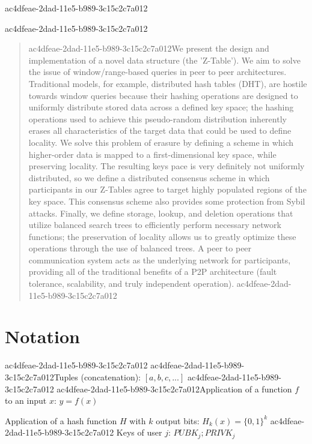 \documentclass[12pt]{article}
\begin{document}
ac4dfeae-2dad-11e5-b989-3c15c2c7a012
\maketitle

ac4dfeae-2dad-11e5-b989-3c15c2c7a012\begin{abstract}
ac4dfeae-2dad-11e5-b989-3c15c2c7a012We present the design and implementation of a novel data structure (the 'Z-Table'). We aim to solve the issue of window/range-based queries in peer to peer architectures. Traditional models, for example,  distributed hash tables (DHT), are hostile towards window queries because their hashing operations are designed to uniformly distribute stored data across a defined key space; the hashing operations used to achieve this pseudo-random distribution inherently erases all characteristics of the target data that could be used to define locality. We solve this problem of erasure by defining a scheme in which higher-order data is mapped to a first-dimensional key space, while preserving locality. The resulting keys pace is very definitely not uniformly distributed, so we define a distributed consensus scheme in which participants in our Z-Tables agree to target highly populated regions of the key space. This consensus scheme also provides some protection from Sybil attacks. Finally, we define storage, lookup, and deletion operations that utilize balanced search trees to efficiently perform necessary network functions; the preservation of locality allows us to greatly optimize these operations through the use of balanced trees. A peer to peer communication system acts as the underlying network for participants, providing all of the traditional benefits of a P2P architecture (fault tolerance, scalability, and truly independent operation).
ac4dfeae-2dad-11e5-b989-3c15c2c7a012\end{abstract}

\section{Notation}
ac4dfeae-2dad-11e5-b989-3c15c2c7a012
ac4dfeae-2dad-11e5-b989-3c15c2c7a012Tuples (concatenation): $[a,b,c,...]$
ac4dfeae-2dad-11e5-b989-3c15c2c7a012
ac4dfeae-2dad-11e5-b989-3c15c2c7a012Application of a function $f$ to an input $x$: $y=f(x)$

Application of a hash function $H$ with $k$ output bits: $H_{k}(x) = \{0,1\}^k$
ac4dfeae-2dad-11e5-b989-3c15c2c7a012
Keys of user $j$: $ PUBK_j; PRIVK_j $
\end{document}
